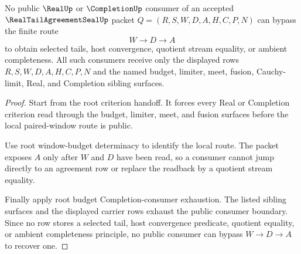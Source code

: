 \begin{theorem}
\label{thm:real-tail-agreement-seal-root-public-consumer-nonescape}
No public $\RealUp$ or $\CompletionUp$ consumer of an accepted $\RealTailAgreementSealUp$ packet $Q=(R,S,W,D,A,H,C,P,N)$ can bypass the finite route
$$
W \to D \to A
$$
to obtain selected tails, host convergence, quotient stream equality, or ambient completeness. All such consumers receive only the displayed rows $R,S,W,D,A,H,C,P,N$ and the named budget, limiter, meet, fusion, Cauchy-limit, Real, and Completion sibling surfaces.
\end{theorem}
\begin{proof}
Start from the root criterion handoff. It forces every Real or Completion criterion read through the budget, limiter, meet, and fusion surfaces before the local paired-window route is public.

Use root window-budget determinacy to identify the local route. The packet exposes $A$ only after $W$ and $D$ have been read, so a consumer cannot jump directly to an agreement row or replace the readback by a quotient stream equality.

Finally apply root budget Completion-consumer exhaustion. The listed sibling surfaces and the displayed carrier rows exhaust the public consumer boundary. Since no row stores a selected tail, host convergence predicate, quotient equality, or ambient completeness principle, no public consumer can bypass $W \to D \to A$ to recover one.
\end{proof}

